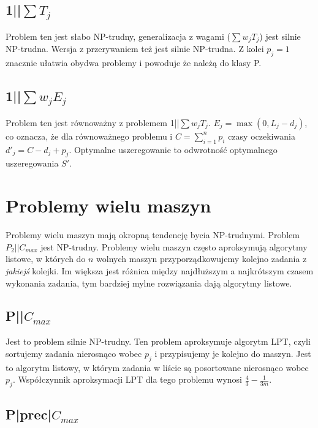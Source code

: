 \documentclass{../notatki}
\begin{document}
\subsection{1||\texorpdfstring{$\sum T_j$}{sum Tj}}

Problem ten jest słabo NP-trudny, generalizacja z wagami ($\sum w_j T_j$)
jest silnie NP-trudna. Wersja z przerywaniem też jest silnie NP-trudna.
Z kolei $p_j = 1$ znacznie ułatwia obydwa problemy i powoduje że należą
do klasy P.

\subsection{1||\texorpdfstring{$\sum w_jE_j$}{sum wjEj}}

Problem ten jest równoważny z problemem 1||$\sum w_jT_j$.
$E_j = \max(0, L_j - d_j)$, co oznacza, że dla równoważnego problemu
i $C = \sum_{i=1}^n p_i$ czasy oczekiwania $d'_j = C - d_j + p_j$.
Optymalne uszeregowanie to odwrotność optymalnego uszeregowania $S'$.

\section{Problemy wielu maszyn}

Problemy wielu maszyn mają okropną tendencję bycia NP-trudnymi. Problem
$P_2||C_{max}$ jest NP-trudny. Problemy wielu maszyn często
aproksymują algorytmy listowe, w których do $n$ wolnych maszyn
przyporządkowujemy kolejno zadania z \textit{jakiejś} kolejki. Im
większa jest różnica między najdłuższym a najkrótszym czasem
wykonania zadania, tym bardziej mylne rozwiązania dają algorytmy listowe.

\subsection{P||\texorpdfstring{$C_{max}$}{Cmax}}

Jest to problem silnie NP-trudny.
Ten problem aproksymuje algorytm LPT, czyli sortujemy zadania nierosnąco
wobec $p_j$ i przypisujemy je kolejno do maszyn. Jest to algorytm
listowy, w którym zadania w liście są posortowane nierosnąco
wobec $p_j$. Współczynnik aproksymacji LPT dla tego problemu wynosi
$\frac{4}{3} - \frac{1}{3m}$.

\subsection{P|prec|\texorpdfstring{$C_{max}$}{Cmax}}
\end{document}
